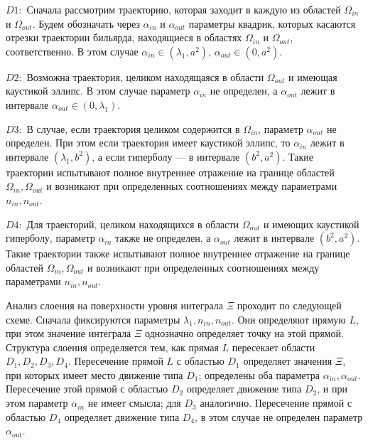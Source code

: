 $D1:$ Сначала рассмотрим траекторию, которая заходит в каждую из областей $\Omega_{in}$ и $\Omega_{out}$.
Будем обозначать через $\alpha_{in}$ и $\alpha_{out}$ параметры квадрик, которых касаются отрезки траектории бильярда, находящиеся в областях $\Omega_{in}$ и $\Omega_{out}$, соответственно. В этом случае  $\alpha_{in} \in (\lambda_1, a^2)$, $\alpha_{out} \in (0, a^2)$.

$D2:$ Возможна траектория, целиком находящаяся в области $\Omega_{out}$ и имеющая каустикой эллипс. В этом случае параметр $\alpha_{in}$ не определен, а $\alpha_{out}$ лежит в интервале $\alpha_{out} \in (0, \lambda_1)$.

$D3:$ В случае, если траектория целиком содержится в $\Omega_{in}$, параметр $\alpha_{out}$ не определен. При этом если траектория имеет каустикой эллипс, то $\alpha_{in}$ лежит в интервале $(\lambda_1, b^2)$, а если гиперболу --- в интервале $(b^2, a^2)$.
 Такие траектории испытывают полное внутреннее отражение на границе областей $\Omega_{in}, \Omega_{out}$ и возникают при определенных соотношениях между параметрами $n_{in}, n_{out}$. 

$D4:$ Для траекторий, целиком находящихся в области $\Omega_{out}$ и имеющих каустикой гиперболу,  параметр $\alpha_{in}$ также не определен, а $\alpha_{out}$ лежит в интервале $(b^2, a^2)$.
Такие траектории также испытывают полное внутреннее отражение на границе областей $\Omega_{in}, \Omega_{out}$ и возникают при определенных соотношениях между параметрами $n_{in}, n_{out}$.


Анализ слоения на поверхности уровня интеграла $\Xi$ проходит по следующей схеме.
Сначала фиксируются параметры $\lambda_1, n_{in}, n_{out}$. Они определяют прямую $L$, при этом значение интеграла $\Xi$ однозначно определяет точку на этой прямой. Структура слоения определяется тем, как прямая $L$ пересекает области $D_1, D_2, D_3, D_4$.
Пересечение прямой $L$ с областью $D_1$ определяет значения $\Xi$, при которых имеет место движение типа $D_1$; определены оба параметра $\alpha_{in}, \alpha_{out}$.
Пересечение этой прямой с областью $D_2$ определяет движение типа $D_2$, и при этом  параметр $\alpha_{in}$ не имеет смысла; для $D_3$ аналогично. 
Пересечение прямой с областью $D_4$ определяет движение типа $D_4$, в этом случае не  определен параметр $\alpha_{out}$.


